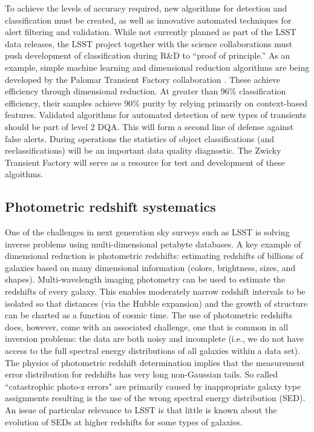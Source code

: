 \documentclass[SE,toc,lsstdraft]{lsstdoc}
\newcommand{\newtext}[1]{{\color{blue} #1}}
\begin{document}
To achieve the levels of accuracy required, new algorithms for detection and classification must be created, as well as innovative automated techniques for alert filtering and validation.  While not currently planned as part of the LSST data releases, the LSST project together with the science collaborations must push development of classification during R\&D to ``proof of principle.''  As an example, simple machine learning and dimensional reduction algorithms are being developed by the Palomar Transient Factory collaboration \citep{2012PASP..124.1175B}.  These achieve efficiency through dimensional reduction. At greater than 96\% classification efficiency, their samples achieve 90\% purity by relying primarily on context-based features. Validated algorithms for automated detection of new types of transients should be part of level 2 DQA. This will form a second line of defense against false alerts. During operations the statistics of object classifications (and reclassifications) will be an important data quality diagnostic.
\newtext{
The Zwicky Transient Factory will serve as a resource for test and development of these algoithms.
}

\subsection{Photometric redshift systematics}

One of the challenges in next generation sky surveys such as LSST is solving inverse problems using multi-dimensional petabyte databases. A key example of dimensional reduction is photometric redshifts: estimating redshifts of billions of galaxies based on many dimensional information (colors, brightness, sizes, and shapes). Multi-wavelength imaging photometry can be used to estimate the redshifts of every galaxy.  This enables moderately narrow redshift intervals to be isolated so that distances (via the Hubble expansion) and the growth of structure can \newtext{be} charted as a function of cosmic time.  The use of photometric redshifts does, however, come with an associated challenge, one that is common in all inversion problems: the data are both noisy and incomplete (i.e., we do not have access to the full spectral energy distributions of all galaxies within a data set). The physics of photometric redshift determination implies that the measurement error distribution for redshifts has very long non-Gaussian tails. So called ``catastrophic photo-z errors" are primarily caused by inappropriate galaxy type assignments resulting is the use of the wrong spectral energy distribution (SED). An issue of particular relevance to LSST is that little is known about the evolution of SEDs at higher redshifts for some types of galaxies.
\end{document}
